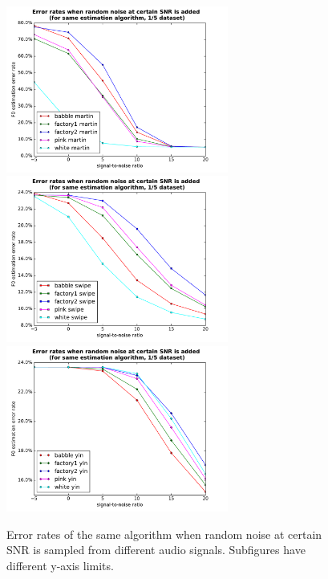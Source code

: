 \documentclass[11pt,a4paper]{report}
\begin{document}
\begin{figure}[htbp]
  \centering
  \includegraphics[width=0.65\textwidth]{error_rates_random_noise_wrt_snr_martin.pdf}
  \includegraphics[width=0.65\textwidth]{error_rates_random_noise_wrt_snr_swipe.pdf}
  \includegraphics[width=0.65\textwidth]{error_rates_random_noise_wrt_snr_yin.pdf}
  \caption[Error rates of the same algorithm when random noise at certain SNR is sampled from different audios.]{Error rates of the same algorithm when random noise at certain SNR is sampled from different audio signals.
    Subfigures have different y-axis limits.}
  \label{fig:random-noise-snr-same-algorithm}
\end{figure}
\end{document}
